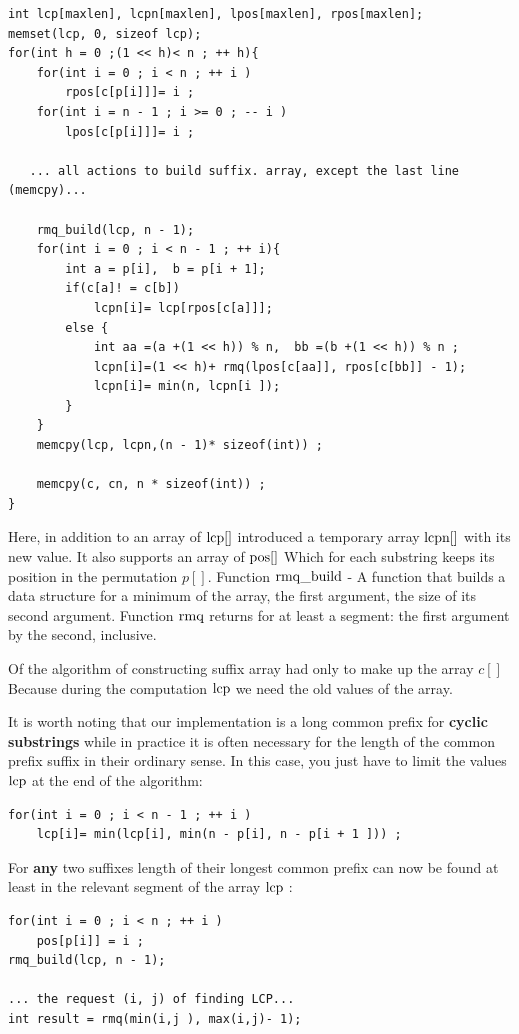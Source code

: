 \begin{verbatim}
int lcp[maxlen], lcpn[maxlen], lpos[maxlen], rpos[maxlen];
memset(lcp, 0, sizeof lcp);
for(int h = 0 ;(1 << h)< n ; ++ h){
    for(int i = 0 ; i < n ; ++ i )
        rpos[c[p[i]]]= i ;
    for(int i = n - 1 ; i >= 0 ; -- i )
        lpos[c[p[i]]]= i ;
 
   ... all actions to build suffix. array, except the last line (memcpy)...
 
    rmq_build(lcp, n - 1);
    for(int i = 0 ; i < n - 1 ; ++ i){
        int a = p[i],  b = p[i + 1];
        if(c[a]! = c[b])
            lcpn[i]= lcp[rpos[c[a]]];
        else {
            int aa =(a +(1 << h)) % n,  bb =(b +(1 << h)) % n ;
            lcpn[i]=(1 << h)+ rmq(lpos[c[aa]], rpos[c[bb]] - 1);
            lcpn[i]= min(n, lcpn[i ]);
        }
    }
    memcpy(lcp, lcpn,(n - 1)* sizeof(int)) ;
 
    memcpy(c, cn, n * sizeof(int)) ;
} 
\end{verbatim}
Here, in addition to an array of $\rm lcp []$ introduced a temporary array $\rm lcpn []$ with its new value. It also supports an array of $\rm pos []$ Which for each substring keeps its position in the permutation $p []$. Function $\rm rmq \_build$ - A function that builds a data structure for a minimum of the array, the first argument, the size of its second argument. Function $\rm rmq$ returns for at least a segment: the first argument by the second, inclusive.

Of the algorithm of constructing suffix array had only to make up the array $c []$ Because during the computation $\rm lcp$ we need the old values ​​of the array.

It is worth noting that our implementation is a long common prefix for \textbf{cyclic substrings} while in practice it is often necessary for the length of the common prefix suffix in their ordinary sense. In this case, you just have to limit the values $\rm lcp$ at the end of the algorithm:

\begin{verbatim}
for(int i = 0 ; i < n - 1 ; ++ i )
    lcp[i]= min(lcp[i], min(n - p[i], n - p[i + 1 ])) ; 
\end{verbatim}
For \textbf{any} two suffixes length of their longest common prefix can now be found at least in the relevant segment of the array $\rm lcp$ :

\begin{verbatim}
for(int i = 0 ; i < n ; ++ i )
    pos[p[i]] = i ;
rmq_build(lcp, n - 1);
 
... the request (i, j) of finding LCP...
int result = rmq(min(i,j ), max(i,j)- 1); 
\end{verbatim}
